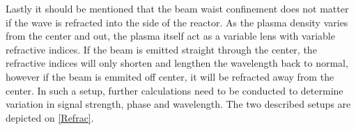 Lastly it should be mentioned that the beam waist confinement does not matter if the wave is refracted into the side of the reactor. As the plasma density varies from the center and out, the plasma itself act as a variable lens with variable refractive indices. If the beam is emitted straight through the center, the refractive indices will only shorten and lengthen the wavelength back to normal, however if the beam is emmited off center, it will be refracted away from the center. In such a setup, further calculations need to be conducted to determine variation in signal strength, phase and wavelength. The two described setups are depicted on \cref{Refrac}.

